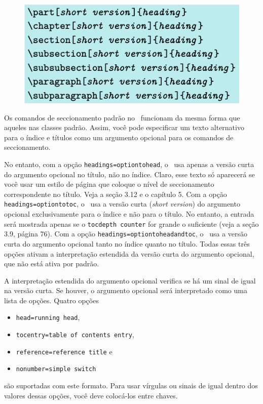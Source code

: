 \begin{figure}
    \centering
    \includegraphics[width=0.65\linewidth]{imagem18.png}
    \label{fig:img18}
\end{figure}

Os comandos de seccionamento padrão no \KOMAScript\ funcionam da mesma forma que aqueles nas classes padrão. Assim, você pode especificar um texto alternativo para o índice e títulos como um argumento opcional para os comandos de seccionamento.

No entanto, com a opção \texttt{headings=optiontohead}, o \KOMAScript\ usa apenas a versão curta do argumento opcional no título, não no índice. Claro, esse texto só aparecerá se você usar um estilo de página que coloque o nível de seccionamento correspondente no título. Veja a seção 3.12 e o capítulo 5. Com a opção \texttt{headings=optiontotoc}, o \KOMAScript\ usa a versão curta (\textit{short version}) do argumento opcional exclusivamente para o índice e não para o título. No entanto, a entrada será mostrada apenas se o \texttt{tocdepth counter} for grande o suficiente (veja a seção 3.9, página 76). Com a opção \texttt{headings=optiontoheadandtoc}, o \KOMAScript\ usa a versão curta do argumento opcional tanto no índice quanto no título. Todas essas três opções ativam a interpretação estendida da versão curta do argumento opcional, que não está ativa por padrão.

A interpretação estendida do argumento opcional verifica se há um sinal de igual na versão curta. Se houver, o argumento opcional será interpretado como uma lista de opções. Quatro opções
\begin{itemize}
    \item \texttt{head=running head},
    \item \texttt{tocentry=table of contents entry},
    \item \texttt{reference=reference title} e 
    \item \texttt{nonumber=simple switch}
\end{itemize}

são suportadas com este formato. Para usar vírgulas ou sinais de igual dentro dos valores dessas opções, você deve colocá-los entre chaves.

